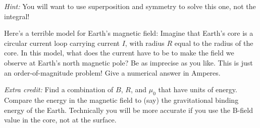 \documentclass[12pt]{article}
\begin{document}
\textit{Hint:} You will want to use superposition and symmetry to
solve this one, not the integral!

\startproblem%
Here's a terrible model for Earth's magnetic field: Imagine that
Earth's core is a circular current loop carrying current $I$, with
radius $R$ equal to the radius of the core. In this model, what does
the current have to be to make the field we observe at Earth's
north magnetic pole? Be as imprecise as you like. This is just an
order-of-magnitude problem! Give a numerical answer in Amperes.

\textit{Extra credit:} Find a combination of $B$, $R$, and $\mu_0$
that have units of energy. Compare the energy in the magnetic field
to (say) the gravitational binding energy of the Earth. Technically
you will be more accurate if you use the B-field value in the core,
not at the surface.
\end{document}
